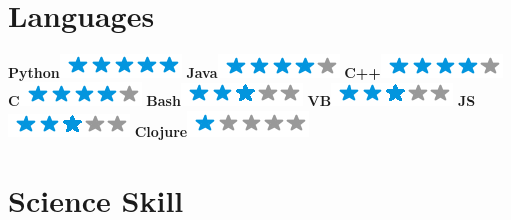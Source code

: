 \begin{aside}
	~
	~
	~
	~
	~
	~
	~
	~
	~
	~
	~
    \section{Languages}
    \textbf{Python}\includegraphics[scale=0.40]{img/5stars.png}
    \textbf{Java}\includegraphics[scale=0.40]{img/4stars.png}
    \textbf{C++}\includegraphics[scale=0.40]{img/4stars.png}
    \textbf{C}\includegraphics[scale=0.40]{img/4stars.png}
    \textbf{Bash}\includegraphics[scale=0.40]{img/3stars.png}
    \textbf{VB}\includegraphics[scale=0.40]{img/3stars.png}
    \textbf{JS}\includegraphics[scale=0.40]{img/3stars.png}
    \textbf{Clojure}\includegraphics[scale=0.40]{img/1stars.png}
    ~
	~
	~
	~
	~
	~
	~
	~
	~
	~
    \section{Science Skill}
    ~
    ~
    ~
\end{aside}
